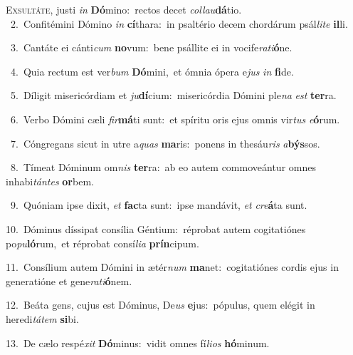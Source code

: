 \lettrine{\initial\textcolor{\initialcolor}{E}}{xsultáte,} justi \textit{in} \textbf{Dó}\-mino:~\star rectos decet \textit{col}\-\textit{lau}\textbf{dá}tio.\\
{\numbfont\textcolor{\numbcolor}{~2.}}~Confitémini Dómino \textit{in} \textbf{cí}\-thara:~\star in psaltério decem chordárum psál\-\textit{li}\-\textit{te} \textbf{il}\-li.\par
{\numbfont\textcolor{\numbcolor}{~3.}}~Cantáte ei cánti\textit{cum} \textbf{no}\-vum:~\star bene psállite ei in vocife\-\textit{ra}\-\textit{ti}\textbf{ó}ne.\par
{\numbfont\textcolor{\numbcolor}{~4.}}~Quia rectum est ver\textit{bum} \textbf{Dó}\-mini,~\star et ómnia ópera e\textit{jus} \textit{in} \textbf{fi}\-de.\par
{\numbfont\textcolor{\numbcolor}{~5.}}~Díligit misericórdiam et \textit{ju}\-\textbf{dí}cium:~\star misericórdia Dómini ple\textit{na} \textit{est} \textbf{ter}\-ra.\par
{\numbfont\textcolor{\numbcolor}{~6.}}~Verbo Dómini cæli \textit{fir}\-\textbf{má}ti sunt:~\star et spíritu oris ejus omnis vir\textit{tus} \textit{e}\-\textbf{ó}rum.\par
{\numbfont\textcolor{\numbcolor}{~7.}}~Cóngregans sicut in utre a\textit{quas} \textbf{ma}\-ris:~\star ponens in thesáu\textit{ris} \textit{a}\-\textbf{býs}sos.\par
{\numbfont\textcolor{\numbcolor}{~8.}}~Tímeat Dóminum om\textit{nis} \textbf{ter}\-ra:~\star ab eo autem commoveántur omnes inhabi\-\textit{tán}\-\textit{tes} \textbf{or}\-bem.\par
{\numbfont\textcolor{\numbcolor}{~9.}}~Quóniam ipse dixit, \textit{et} \textbf{fac}\-ta sunt:~\star ipse mandávit, \textit{et} \textit{cre}\-\textbf{á}ta sunt.\par
{\numbfont\textcolor{\numbcolor}{10.}}~Dóminus díssipat consília Géntium:~\dagger réprobat autem cogitatiónes po\-\textit{pu}\-\textbf{ló}rum,~\star et réprobat consí\-\textit{li}\-\textit{a} \textbf{prín}\-cipum.\par
{\numbfont\textcolor{\numbcolor}{11.}}~Consílium autem Dómini in ætér\textit{num} \textbf{ma}\-net:~\star cogitatiónes cordis ejus in generatióne et gene\-\textit{ra}\-\textit{ti}\textbf{ó}nem.\par
{\numbfont\textcolor{\numbcolor}{12.}}~Beáta gens, cujus est Dóminus, De\textit{us} \textbf{e}\-jus:~\star pópulus, quem elégit in heredi\-\textit{tá}\-\textit{tem} \textbf{si}\-bi.\par
{\numbfont\textcolor{\numbcolor}{13.}}~De cælo respé\textit{xit} \textbf{Dó}\-minus:~\star vidit omnes fí\-\textit{li}\-\textit{os} \textbf{hó}\-minum.\par
